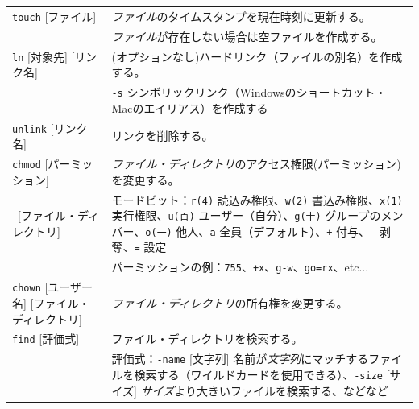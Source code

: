 \documentclass[a4j]{ltjsreport}
\begin{document}
\begin{longtable}[c]{|p{3.5cm}|p{13.5cm}|}
        \texttt{touch} [ファイル]&\emph{ファイル}のタイムスタンプを現在時刻に更新する。\\
        &\emph{ファイル}が存在しない場合は空ファイルを作成する。\\
        \hline

        \texttt{ln} [対象先] [リンク名] &(オプションなし)ハードリンク（ファイルの別名）を作成する。\\
        &\texttt{-s} シンボリックリンク（Windowsのショートカット・Macのエイリアス）を作成する\\
        \hline
        \texttt{unlink} [リンク名] &リンクを削除する。\\
        \hline

        \texttt{chmod} [パーミッション] &\emph{ファイル・ディレクトリ}のアクセス権限(パーミッション)を変更する。\\
        \ [ファイル・ディレクトリ] &モードビット：\texttt{r(4)} 読込み権限、\texttt{w(2)} 書込み権限、\texttt{x(1)} 実行権限、\texttt{u(百)} ユーザー（自分）、\texttt{g(十)} グループのメンバー、\texttt{o(一)} 他人、\texttt{a} 全員（デフォルト）、\texttt{+} 付与、\texttt{-} 剥奪、\texttt{=} 設定\\
        &パーミッションの例：\texttt{755}、\texttt{+x}、\texttt{g-w}、\texttt{go=rx}、etc...\\
        \hline
        \texttt{chown} [ユーザー名] [ファイル・ディレクトリ]&\emph{ファイル・ディレクトリ}の所有権を変更する。\\
        \hline

        \texttt{find} [評価式] &ファイル・ディレクトリを検索する。\\
        &評価式：\texttt{-name} [文字列] 名前が\emph{文字列}にマッチするファイルを検索する（ワイルドカードを使用できる）、\texttt{-size} [サイズ] \emph{サイズ}より大きいファイルを検索する、などなど\\  
        \hline 


\end{longtable}
\end{document}
